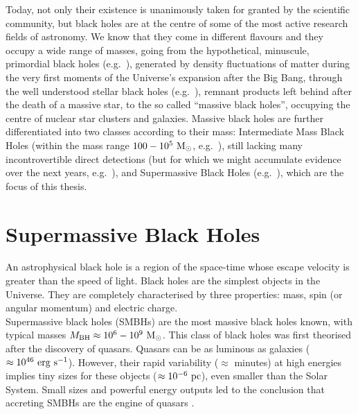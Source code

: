 Today, not only their existence is unanimously taken for granted by the scientific community, 
but black holes are at the centre of some of the most active research fields of astronomy. 
We know that they come in different flavours and they occupy a wide range of masses, 
going from the hypothetical, minuscule, primordial black holes (e.g.~\citealt{carrhawking1974}), 
generated by density fluctuations of matter during the very first moments of the Universe's expansion 
after the Big Bang, 
through the well understood stellar black holes (e.g.~\citealt{shahbaz1999}), 
remnant products left behind after the death of a massive star, 
to the so called ``massive black holes'', 
occupying the centre of nuclear star clusters and galaxies. 
Massive black holes are further differentiated into two classes according to their mass: 
Intermediate Mass Black Holes (within the mass range $100 - 10^5~\rm M_\odot$, e.g.~\citealt{millercolbert2004,vandermarel2004}), 
still lacking many incontrovertible direct detections 
(but for which we might accumulate evidence over the next years, e.g.~\citealt{pasham2014}), 
and Supermassive Black Holes (e.g.~\citealt{ferrarese2006book}), 
which are the focus of this thesis. 


\section{Supermassive Black Holes} 
An astrophysical black hole is a region of the space-time whose escape velocity is greater than the speed of light.
Black holes are the simplest objects in the Universe. 
They are completely characterised by three properties: mass, spin (or angular momentum) and electric charge. \\

Supermassive black holes (SMBHs) are the most massive black holes known, with typical masses  
$M_{\rm BH} \approx 10^6 - 10^9~\rm M_{\odot}$.
This class of black holes was first theorised \citep{lynden-bell1969,wolfeburbidge1970} after the discovery of quasars.
Quasars can be as luminous as galaxies ($\approx 10^{46}~\rm erg~s^{-1}$).
However, their rapid variability ($\approx$ minutes) at high energies implies tiny sizes for these objects 
($\approx 10^{-6}~\rm pc$), even smaller than the Solar System.
Small sizes and powerful energy outputs led to the conclusion that accreting SMBHs are the engine of quasars
\citep{salpeter1964,zeldovichnovikov1964,lynden-bell1978}. \\

